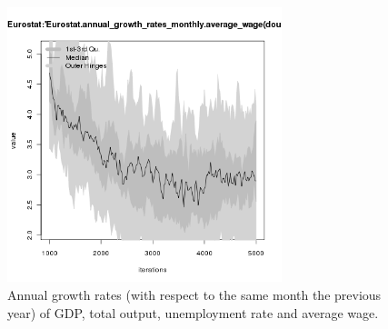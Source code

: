 \begin{figure}[H!]
\begin{minipage}{17cm}
\includegraphics[width=8cm]{./png/tax_0.10/Eurostat-annual_growth_rates_monthly_average_wage.png}
\end{minipage}
\caption{Annual growth rates (with respect to the same month the previous year) of GDP, total output, unemployment rate and average wage.}
\label{Figure: Eurostat macrodata growth rates}
\end{figure}
\clearpage

